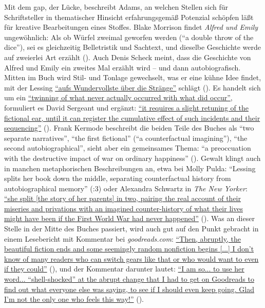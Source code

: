 \documentclass[fontsize=12pt]{scrartcl}
\begin{document}
Mit dem gap, der L\"ucke, beschreibt Adams, an welchen Stellen sich f\"ur Schriftsteller\textsuperscript{\tiny *} in thematischer Hinsicht erfah\-rungsgem\"a{\ss} Potenzial sch\"opfen l\"a{\ss}t f\"ur kreative Bearbeitungen eines Stoffes. Blake Morrison findet \textit{Alfred und Emily} ungew\"ohnlich: Als ob W\"urfel zweimal geworfen werden ("`a double throw of the dice"'), sei es gleich\-zei\-tig Belletristik und Sachtext, und dieselbe Geschichte werde auf zweierlei Art erz\"ahlt (\cite{Morrison2008}). Auch Denis Scheck meint, dass die Geschichte von Alfred und Emily ein zweites Mal erz\"ahlt wird -- und dann autobiografisch. Mitten im Buch wird Stil- und Tonlage gewechselt, was er eine k\"uhne Idee findet, mit der Lessing \href{http://www.deutschlandradiokultur.de/nachgetragene-tochterliebe.950.de.html?dram:article_id=136885}{"`aufs Wundervollste \"uber die Str\"ange"'} schl\"agt (\cite{Scheck2008}). Es handelt sich um ein \href{http://www.oxonianreview.org/wp/stories-to-herself/}{"`twinning of what never actually occurred with what did occur"'}, formuliert es David Sergeant und erg\"anzt: \href{http://www.oxonianreview.org/wp/stories-to-herself/}{"`it requires a slight retuning of the fictional ear, until it can register the cumulative effect of such incidents and their sequencing"'} (\cite{Sergeant2008}). Frank Kermode beschreibt die beiden Teile des Buches als "`two separate narratives"', "`the first fictional"' ("`a counterfactual imagining"'), "`the second autobiographical"', sieht aber ein gemeinsames Thema: "`a preoccuation with the destructive impact of war on ordinary happiness"' (\cite{Kermode2008}). Gewalt klingt auch in manchen metaphorischen Beschreibungen an, etwa bei Molly Pulda: "`Lessing splits her book down the middle, separating counterfactual history from autobiographical memory"' (\cite{Pulda2010}:3) oder Alexandra Schwartz in \textit{The New Yorker}: \href{http://www.newyorker.com/books/page-turner/on-doris-lessing-and-not-saying-thank-you}{"`she split [the story of her parents] in two, pairing the real account of their miseries and privations with an imagined counter-history of what their lives might have been if the First World War had never happened"'} (\cite{Schwartz2013}). Was an dieser Stelle in der Mitte des Buches passiert, wird auch gut auf den Punkt gebracht in einem Lesebericht mit Kommentar bei \textit{goodreads.com}: \href{https://www.goodreads.com/review/show/31104294}{"`Then, abruptly, the beautiful fiction ends and some seemingly random nonfiction begins [...] I don't know of many readers who can switch gears like that or who would want to even if they could"'} (\cite{Lara2008}), und der Kommentar darunter lautet: \href{https://www.goodreads.com/review/show/31104294?page=1\#comment_77325756}{"`I am so... to use her word... "`shell-shocked"' at the abrupt change that I had to get on Goodreads to find out what everyone else was saying, to see if I should even keep going. Glad I'm not the only one who feels this way!"'} (\cite{Haley2013}). 
\end{document}

